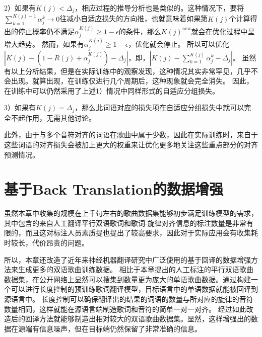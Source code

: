 2）如果有$K(j) < \Delta_j$，相应过程的推导分析也是类似的。这种情况下，要将$\sum_{k=1}^{K(j)-1}\alpha_j^k\rightarrow0$往减小自适应损失的方向推，也就意味着如果第$K(j)$个计算得出的停止概率仍不满足$\alpha_j^{K(j)} \geq 1-\epsilon$的条件，那么$K(j)^{\text{new}}$就会在优化过程中呈增大趋势。
然而，如果有$\alpha_j^{K(j)} \geq 1 - \epsilon$，优化就会停止。
所以可以优化$\left| K(j) - \left(1 - R(j) + \alpha_j^{K(j)}\right) - \Delta_j \right|$，即，$\left| K(j) -\sum_{k=1}^{K(j)} \alpha_j^{k} - \Delta_j \right|$。
虽然有以上分析结果，但是在实际训练中的观察发现，这种情况其实非常罕见，几乎不会出现。就算出现，在训练仅进行几个周期后，这种现象就会完全消失。
因此，在训练中可以仍然采用了上述1）情况中同样形式的自适应分组损失。


3）如果有$K(j) = \Delta_j$，那么此词语对应的损失项在自适应分组损失中就可以完全不起作用，无需其他讨论。

此外，由于与多个音符对齐的词语在歌曲中属于少数，因此在实际训练时，来自于这些词语的对齐损失会被加上更大的权重来让优化更多地关注这些重点部分的对齐预测情况。
\section{基于Back Translation的数据增强}
\label{sec:bta}
虽然本章中收集的规模在上千句左右的歌曲数据集能够初步满足训练模型的需求，其中包含的来自人工翻译平行双语歌词和歌词-旋律对齐信息的标注数量是非常有限的，而且这对标注人员素质提也提出了较高要求，因此对于实际应用会有收集耗时较长，代价昂贵的问题。

所以，本章还改造了近年来神经机器翻译研究中广泛使用的基于回译的数据增强方法\citep{backtrans}来生成更多的双语歌曲训练数据。
相比于本章提出的人工标注的平行双语歌曲数据集，在公开网络上显然可以搜集到数量更为庞大的单语歌曲数据。通过构建一个可以进行长度控制的预训练歌词翻译模型，目标语言中的单语数据就能被回译到源语言中。
长度控制可以确保翻译出的结果的词语的数量与所对应的旋律的音符数量相同，这样就能在源语言端制造歌词和音符的简单一对一对齐。
经过如此改造后的回译方法就能够制造出相对较大的双语歌曲数据集。显然，这样增强出的数据在源端有信息噪声，但在目标端仍然保留了非常准确的信息。
